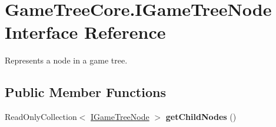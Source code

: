 \hypertarget{interface_game_tree_core_1_1_i_game_tree_node}{}\section{Game\+Tree\+Core.\+I\+Game\+Tree\+Node Interface Reference}
\label{interface_game_tree_core_1_1_i_game_tree_node}


Represents a node in a game tree. ~\newline
 


\subsection*{Public Member Functions}
\begin{DoxyCompactItemize}
\item 
\mbox{\label{interface_game_tree_core_1_1_i_game_tree_node_ab5a6e0a1ba3046ecc5c79a95ca733a46}} 
Read\+Only\+Collection$<$ \mbox{\hyperlink{interface_game_tree_core_1_1_i_game_tree_node}{I\+Game\+Tree\+Node}} $>$ {\bfseries get\+Child\+Nodes} ()
\end{DoxyCompactItemize}
